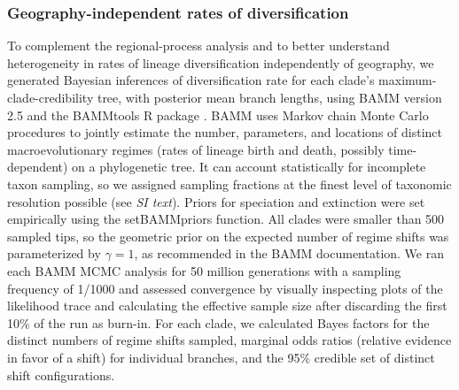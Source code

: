 \subsubsection*{Geography-independent rates of diversification}

To complement the regional-process analysis and to better understand
heterogeneity in rates of lineage diversification independently of
geography, we generated Bayesian inferences of diversification rate
for each clade's maximum-clade-credibility tree, with posterior mean
branch lengths, using BAMM version 2.5 and the BAMMtools R package
\citep{Rabosky2014}. BAMM uses Markov chain Monte Carlo procedures to
jointly estimate the number, parameters, and locations of distinct
macroevolutionary regimes (rates of lineage birth and death, possibly
time-dependent) on a phylogenetic tree. It can account statistically
for incomplete taxon sampling, so we assigned sampling fractions at
the finest level of taxonomic resolution possible (see \textit{SI
  text}). Priors for speciation and extinction
were set empirically using the \textrm{setBAMMpriors} function. All
clades were smaller than 500 sampled tips, so the geometric prior on
the expected number of regime shifts was parameterized by
$\gamma = 1$, as recommended in the BAMM documentation. We ran each
BAMM MCMC analysis for 50 million generations with a sampling
frequency of 1/1000 and assessed convergence by visually inspecting
plots of the likelihood trace and calculating the effective sample
size after discarding the first 10\% of the run as burn-in. For each
clade, we calculated Bayes factors for the distinct numbers of regime
shifts sampled, marginal odds ratios (relative evidence in favor of a
shift) for individual branches, and the 95\% credible set of distinct
shift configurations.

